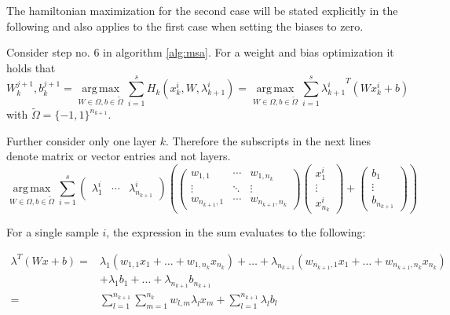 \documentclass[a4paper, 12pt]{scrreprt} %
\DeclareMathOperator*{\argmax}{arg\,max}
\begin{document}
The hamiltonian maximization for the second case will be stated explicitly in the following and also applies to the first case when setting the biases to zero.

Consider step no. 6 in algorithm \ref{alg:msa}. For a weight and bias optimization it holds that
\begin{equation*}
W_k^{j+1}, b_k^{j+1} = \underset{W\in \Omega, b \in \tilde\Omega}{\argmax} \sum_{i=1}^s{H_k(x_k^{i},W,\lambda_{k+1}^{i})} = \underset{W\in \Omega, b \in \tilde\Omega}{\argmax} \sum_{i=1}^s{{\lambda_{k+1}^{i}}^T (W x_k^{i} + b)}
\end{equation*}
with $\tilde{\Omega} = \{-1,1\}^{n_{k+1}}$.

Further consider only one layer $k$. Therefore the subscripts in the next lines denote matrix or vector entries and not layers.
\begin{equation*}
\underset{W\in \Omega, b \in \tilde\Omega}{\argmax} \sum_{i=1}^s \begin{pmatrix}
	\lambda^i_1 & \cdots & \lambda^i_{n_{k+1}}
\end{pmatrix} \left( \begin{pmatrix}
	w_{1,1} 					& \cdots & w_{1,n_{k}} \\
	\vdots  					& \ddots & \vdots \\
	w_{n_{k+1},1} & \cdots & w_{n_{k+1},n_{k}}
\end{pmatrix} \begin{pmatrix}
	x^i_1 \\
	\vdots \\
	x^i_{n_{k}}
\end{pmatrix} + \begin{pmatrix}
	b_1 \\
	\vdots \\
	b_{n_{k+1}}
\end{pmatrix}
\right)
\end{equation*}

For a single sample $i$, the expression in the sum evaluates to the following:

\begin{align*}
\lambda^T (W x +b) =& \lambda_1 (w_{1,1} x_1 + \dots + w_{1,n_k} x_{n_k}) + \dots + \lambda_{n_{k+1}} (w_{n_{k+1},1} x_1 + \dots + w_{n_{k+1},n_k} x_{n_k}) \\
& + \lambda_1 b_1+ \dots + \lambda_{n_{k+1}} b_{n_{k+1}} \\
 =& \sum_{l=1}^{n_{k+1}} \sum_{m=1}^{n_{k}} {w_{l,m} \lambda_l x_m} + \sum_{l=1}^{n_{k+1}} {\lambda_l b_l}
\end{align*}
\end{document}
